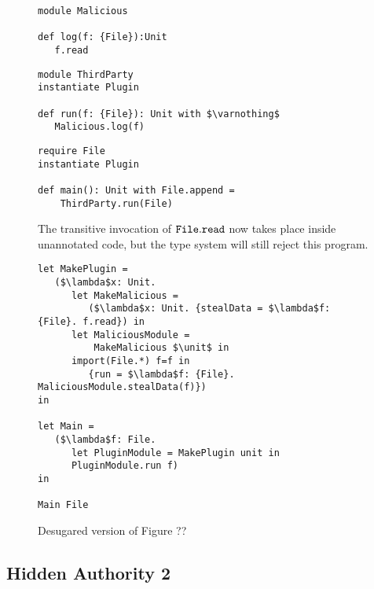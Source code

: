 \begin{figure}[h]

\begin{lstlisting}
module Malicious

def log(f: {File}):Unit
   f.read
\end{lstlisting}

\begin{lstlisting}
module ThirdParty
instantiate Plugin

def run(f: {File}): Unit with $\varnothing$
   Malicious.log(f)
\end{lstlisting}

\begin{lstlisting}
require File
instantiate Plugin

def main(): Unit with File.append =
    ThirdParty.run(File)
\end{lstlisting}

\caption{The transitive invocation of $\mathtt{File.read}$ now takes place inside unannotated code, but the type system will still reject this program.}
\label{This is the label.}
\end{figure}

\begin{figure}[h]

\begin{lstlisting}
let MakePlugin =
   ($\lambda$x: Unit.
      let MakeMalicious =
         ($\lambda$x: Unit. {stealData = $\lambda$f: {File}. f.read}) in
      let MaliciousModule =
          MakeMalicious $\unit$ in
      import(File.*) f=f in
         {run = $\lambda$f: {File}. MaliciousModule.stealData(f)})
in
      
let Main =
   ($\lambda$f: File.
      let PluginModule = MakePlugin unit in
      PluginModule.run f)
in

Main File
\end{lstlisting}

\caption{Desugared version of Figure ??}
\label{This is the label.}
\end{figure}

\subsection{Hidden Authority 2} 

